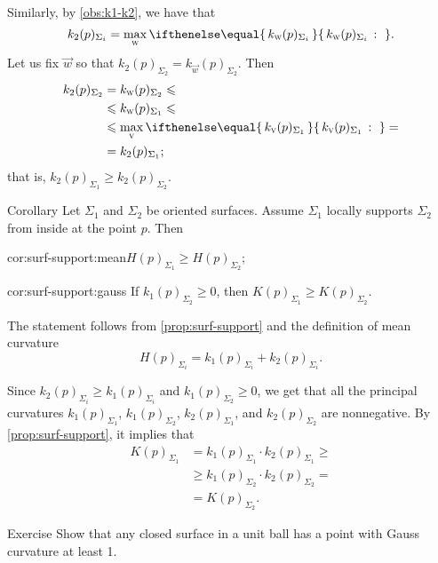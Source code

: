 Similarly, by \ref{obs:k1-k2}, we have that
\[k_2(p)_{\Sigma_i}=\max_{\vec w}\set{k_{\vec w}(p)_{\Sigma_i}}{}.\]
Let us fix ${\vec w}$ so that $k_2(p)_{\Sigma_2}=k_{\vec w}(p)_{\Sigma_2}$.
Then 
\begin{align*}
k_2(p)_{\Sigma_2}&=k_{\vec w}(p)_{\Sigma_2}\le
\\
&\le k_{\vec w}(p)_{\Sigma_1}\le
\\
&\le\max_{\vec v}\set{k_{\vec v}(p)_{\Sigma_1}}{}=
\\
&=k_2(p)_{\Sigma_1};
\end{align*}
that is, $k_2(p)_{\Sigma_1}\ge k_2(p)_{\Sigma_2}$.
\qeds

\begin{thm}{Corollary}\label{cor:surf-support}
Let $\Sigma_1$ and $\Sigma_2$ be oriented surfaces.
Assume $\Sigma_1$ locally supports $\Sigma_2$ from inside at the point $p$.
Then

\begin{subthm}{cor:surf-support:mean}$H(p)_{\Sigma_1}\ge H(p)_{\Sigma_2}$;
\end{subthm}

\begin{subthm}{cor:surf-support:gauss} If $k_1(p)_{\Sigma_2}\ge 0$, then $K(p)_{\Sigma_1}\ge K(p)_{\Sigma_2}$.
\end{subthm}
 
\end{thm}

The statement follows from  \ref{prop:surf-support} and the definition of mean curvature
\[H(p)_{\Sigma_i}=k_1(p)_{\Sigma_i}+k_2(p)_{\Sigma_i}.\]


 Since $k_2(p)_{\Sigma_i}\ge k_1(p)_{\Sigma_i}$ and $k_1(p)_{\Sigma_2}\ge 0$, we get that all the principal curvatures 
$k_1(p)_{\Sigma_1}$, 
$k_1(p)_{\Sigma_2}$, 
$k_2(p)_{\Sigma_1}$, and 
$k_2(p)_{\Sigma_2}$ are nonnegative.
By \ref{prop:surf-support}, it implies that
\begin{align*}
K(p)_{\Sigma_1}&=k_1(p)_{\Sigma_1}\cdot k_2(p)_{\Sigma_1}\ge 
\\
&\ge k_1(p)_{\Sigma_2}\cdot k_2(p)_{\Sigma_2}=
\\
&=K(p)_{\Sigma_2}.
\end{align*}
\qedsf

\begin{thm}{Exercise}\label{ex:positive-gauss-0}
Show that any closed surface in a unit ball has a point with Gauss curvature at least 1.
\end{thm}


